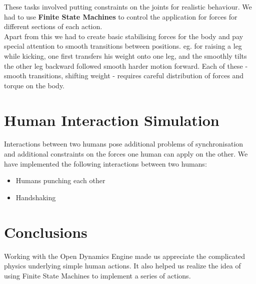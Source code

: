 \documentclass[11pt]{article}
\begin{document}
These tasks involved putting constraints on the joints for realistic behaviour.
We had to use  \textbf{Finite State Machines} to control the application for
forces for different sections of each action.\\
Apart from this we had to create basic stabilising forces for the body and
pay special attention to smooth transitions between positions. eg. for raising
a leg while kicking, one first transfers his weight onto one leg, and the 
smoothly tilts the other leg backward followed smooth harder motion forward.
Each of these - smooth transitions, shifting weight - requires careful
distribution of forces and torque on the body.\\


\section{Human Interaction Simulation}
Interactions between two humans pose additional problems of synchronisation
and additional constraints on the forces one human can apply on the other.
We have implemented the following interactions between two humans:\\
\begin{itemize}
    \item Humans punching each other
    \item Handshaking
\end{itemize}


\section{Conclusions}
Working with the Open Dynamics Engine made us appreciate the complicated
physics underlying simple human actions. It also helped us realize the 
idea of using Finite State Machines to implement a series of actions.
\end{document}
